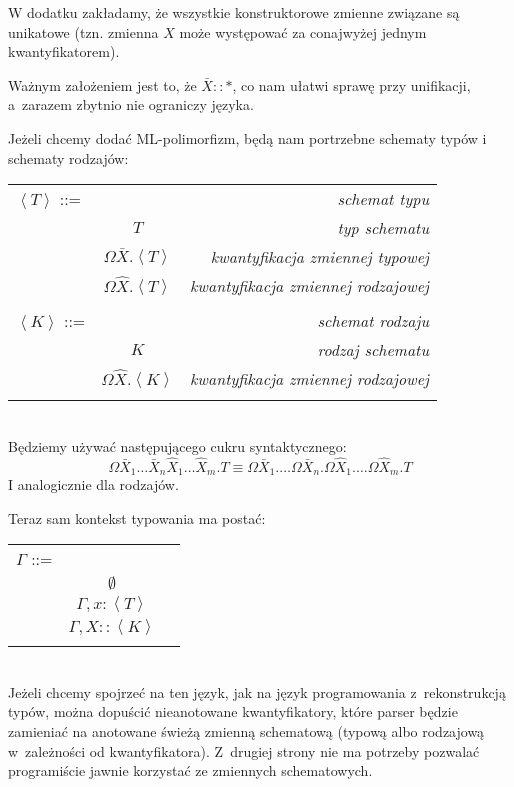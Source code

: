 \documentclass[11pt,leqno]{article}
\begin{document}
W dodatku zakładamy, że wszystkie konstruktorowe zmienne związane są unikatowe (tzn. zmienna $X$ może
występować za conajwyżej jednym kwantyfikatorem).

Ważnym założeniem jest to, że $\bar{X}::*$, co nam ułatwi sprawę przy unifikacji, a~zarazem zbytnio nie ograniczy języka.
  
Jeżeli chcemy dodać ML-polimorfizm, będą nam portrzebne schematy typów i schematy rodzajów:\\

\begin{tabular}{| l c r |}
  \hline
  $\left<T\right>$ ::= &  & \textit{schemat typu} \\
   & $T$ & \textit{typ schematu} \\
   & $\Omega \bar{X}.\left<T\right>$ & \textit{kwantyfikacja zmiennej typowej} \\
   & $\Omega \widehat{X}.\left<T\right>$ & \textit{kwantyfikacja zmiennej rodzajowej} \\
   & & \\
  $\left<K\right>$ ::= &  & \textit{schemat rodzaju} \\
   & $K$ & \textit{rodzaj schematu}\\
   & $\Omega \widehat{X}.\left<K\right>$ & \textit{kwantyfikacja zmiennej rodzajowej} \\
   & & \\
  \hline
\end{tabular} \\

Będziemy używać następującego cukru syntaktycznego:
\[
\Omega \bar{X}_1 \dots \bar{X}_n \widehat{X}_1 \dots \widehat{X}_m.T \equiv 
\Omega \bar{X}_1. \dots \Omega \bar{X}_n. \Omega \widehat{X}_1. \dots \Omega \widehat{X}_m.T
\]
I analogicznie dla rodzajów.

Teraz sam kontekst typowania ma postać:

\begin{tabular}{| l c r |}
  \hline
  $\Gamma$ ::= &  & \\
   & $\emptyset$ & \\
   & $\Gamma, x:\left<T\right>$ & \\
   & $\Gamma, X::\left<K\right>$ & \\
   & & \\
  \hline
\end{tabular} \\

Jeżeli chcemy spojrzeć na ten język, jak na język programowania z~rekonstrukcją typów, można
dopuścić nieanotowane kwantyfikatory, które parser będzie zamieniać na anotowane świeżą zmienną schematową 
(typową albo rodzajową w~zależności od kwantyfikatora). Z~drugiej strony nie ma potrzeby pozwalać programiście
jawnie korzystać ze zmiennych schematowych.
\end{document}
